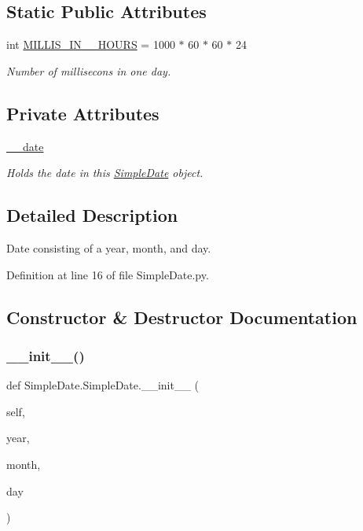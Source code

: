 \subsection*{Static Public Attributes}
\begin{DoxyCompactItemize}
\item 
int \hyperlink{classSimpleDate_1_1SimpleDate_a0481c6d110c7475177a3e59aa89fb20b}{M\+I\+L\+L\+I\+S\+\_\+\+I\+N\+\_\+\_\+\+H\+O\+U\+RS} = 1000 $\ast$ 60 $\ast$ 60 $\ast$ 24
\begin{DoxyCompactList}\small\item\em Number of millisecons in one day. \end{DoxyCompactList}\end{DoxyCompactItemize}
\subsection*{Private Attributes}
\begin{DoxyCompactItemize}
\item 
\hyperlink{classSimpleDate_1_1SimpleDate_a0ae516370c49819c39e89606e163a875}{\+\_\+\+\_\+date}
\begin{DoxyCompactList}\small\item\em Holds the date in this \hyperlink{classSimpleDate_1_1SimpleDate}{Simple\+Date} object. \end{DoxyCompactList}\end{DoxyCompactItemize}


\subsection{Detailed Description}
Date consisting of a year, month, and day. 

Definition at line 16 of file Simple\+Date.\+py.



\subsection{Constructor \& Destructor Documentation}
\mbox{\label{classSimpleDate_1_1SimpleDate_a8e01278f5e3987e64396ef345ccb7dde}} 
\subsubsection{\texorpdfstring{\+\_\+\+\_\+init\+\_\+\+\_\+()}{\_\_init\_\_()}}
{\footnotesize\ttfamily def Simple\+Date.\+Simple\+Date.\+\_\+\+\_\+init\+\_\+\+\_\+ (\begin{DoxyParamCaption}\item[{}]{self,  }\item[{}]{year,  }\item[{}]{month,  }\item[{}]{day }\end{DoxyParamCaption})}



